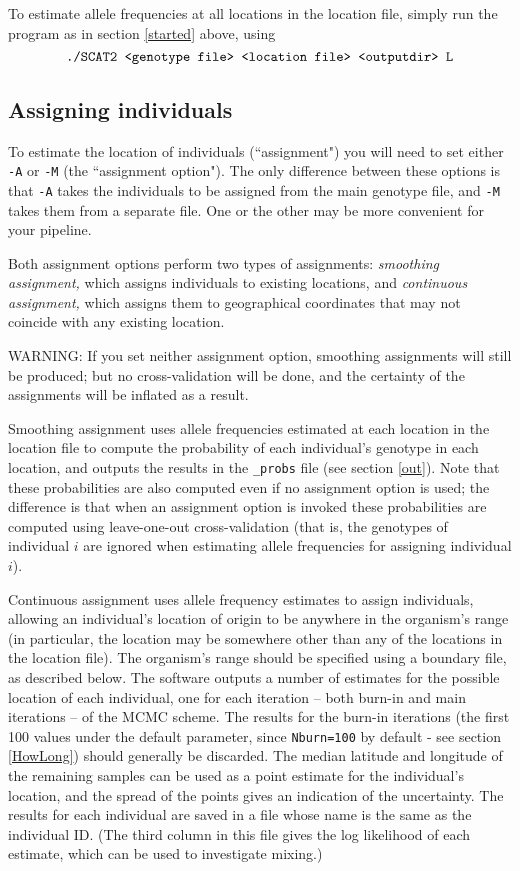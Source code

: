 \documentclass[10pt,titlepage,times,letterpaper]{article}
\begin{document}
To estimate allele frequencies at all locations in the location
file, simply run the program as in section \ref{started} above,
using
$$\text{{\tt ./SCAT2 <genotype file> <location file> <outputdir> L}}$$

\subsection{Assigning individuals}  \label{assign}

To estimate the location of individuals (``assignment") you will need
to set either {\tt -A} or {\tt -M} (the ``assignment option").  The
only difference between these options is that {\tt -A} takes the
individuals to be assigned from the main genotype file, and {\tt -M}
takes them from a separate file.  One or the other may be more
convenient for your pipeline.  

Both assignment options perform two types of assignments: {\it smoothing
 assignment,} which assigns individuals to existing locations, and 
{\it continuous assignment,} which
assigns them to geographical coordinates that may not coincide with any
existing location. 

WARNING:  If you set neither assignment option, smoothing assignments
will still be produced; but no cross-validation will be done, and the certainty of
the assignments will be inflated as a result.

Smoothing assignment uses allele frequencies estimated at each
location in the location file to compute the probability of each
individual's genotype in each location, and outputs the results in the
{\tt \_probs} file (see section \ref{out}). Note that these
probabilities are also computed even if no assignment option is
used; the difference is that when an assignment option is invoked these
probabilities are computed using leave-one-out cross-validation 
(that is, the genotypes of individual $i$ are ignored when estimating allele
frequencies for assigning individual $i$).

Continuous assignment uses allele frequency estimates to assign
individuals, allowing an individual's location of origin to be
anywhere in the organism's range (in particular, the location may
be somewhere other than any of the locations in the location
file). The organism's range should be specified using a
boundary file, as described below. The software outputs a number of
estimates for the possible location of each individual, one for each
iteration -- both burn-in and main iterations -- of the MCMC
scheme. The results for the burn-in iterations (the first 100 values
under the default parameter, since {\tt Nburn=100} by default - see section
\ref{HowLong}) should generally be discarded. The median latitude and
longitude of the remaining samples can be used as a point estimate for
the individual's location, and the spread of the points gives an
indication of the uncertainty. The results for each individual are saved 
in a file whose name is the same as the individual ID. (The third column in
this file gives the log likelihood of each estimate, which can be
used to investigate mixing.)
\end{document}
